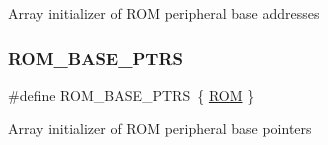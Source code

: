 Array initializer of R\+OM peripheral base addresses \mbox{\label{group___r_o_m___peripheral___access___layer_ga41e000a3e59f16dd8f395cebcb883e82}} 
\subsubsection{\texorpdfstring{ROM\_BASE\_PTRS}{ROM\_BASE\_PTRS}}
{\footnotesize\ttfamily \#define R\+O\+M\+\_\+\+B\+A\+S\+E\+\_\+\+P\+T\+RS~\{ \mbox{\hyperlink{group___r_o_m___peripheral___access___layer_ga408c4c066164afa1b6aa3f804c3d3528}{R\+OM}} \}}

Array initializer of R\+OM peripheral base pointers 